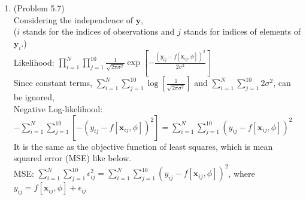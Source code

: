 \documentclass[10pt]{article}
\begin{document}
\begin{enumerate}
\

\item (Problem 5.7) \\
	Considering the independence of $\textbf{y}$, \\
	($i$ stands for the indices of observations and $j$ stands for indices of elements of $\textbf{y}_i$.) \\
	Likelihood: $\prod_{i=1}^N \prod_{j=1}^{10} \frac{1}{\sqrt{2\pi\sigma^2}}\exp[-\frac{(y_{ij}-f[\textbf{x}_{ij}, \phi])^2}{2\sigma^2}]$ \\
	Since constant terms, $\sum_{i=1}^N \sum_{j=1}^{10}\log[\frac{1}{\sqrt{2\pi\sigma^2}}]$ and $\sum_{i=1}^N \sum_{j=1}^{10}2\sigma^2$, can be ignored, \\
	Negative Log-likelihood: $-\sum_{i=1}^N \sum_{j=1}^{10} [-(y_{ij}-f[\textbf{x}_{ij}, \phi])^2]=\sum_{i=1}^N \sum_{j=1}^{10} (y_{ij}-f[\textbf{x}_{ij}, \phi])^2$ \\
	It is the same as the objective function of least squares, which is mean squared error (MSE) like below. \\
	MSE: $\sum_{i=1}^N \sum_{j=1}^{10} \epsilon_{ij}^2=\sum_{i=1}^N \sum_{j=1}^{10} (y_{ij}-f[\textbf{x}_{ij}, \phi])^2$, where $y_{ij}=f[\textbf{x}_{ij}, \phi]+\epsilon_{ij}$
	

\

\end{enumerate}
\end{document}
